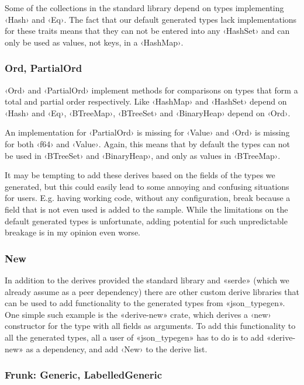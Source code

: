 Some of the collections in the standard library depend on types implementing ‹Hash› and ‹Eq›. The fact that our default generated types lack implementations for these traits means that they can not be entered into any ‹HashSet› and can only be used as values, not keys, in a ‹HashMap›.

\subsubsection{Ord, PartialOrd}

‹Ord› and ‹PartialOrd› implement methods for comparisons on types that form a total and partial order respectively. Like ‹HashMap› and ‹HashSet› depend on ‹Hash› and ‹Eq›, ‹BTreeMap›, ‹BTreeSet› and ‹BinaryHeap› depend on ‹Ord›.

An implementation for ‹PartialOrd› is missing for ‹Value› and ‹Ord› is missing for both ‹f64› and ‹Value›. Again, this means that by default the types can not be used in ‹BTreeSet› and ‹BinaryHeap›, and only as values in ‹BTreeMap›.

It may be tempting to add these derives based on the fields of the types we generated, but this could easily lead to some annoying and confusing situations for users. E.g. having working code, without any configuration, break because a field that is not even used is added to the sample. While the limitations on the default generated types is unfortunate, adding potential for such unpredictable breakage is in my opinion even worse.

\subsubsection{New}

In addition to the derives provided the standard library and «serde»  (which we already assume as a peer dependency) there are other custom derive libraries that can be used to add functionality to the generated types from «json_typegen». One simple such example is the «derive-new» crate, which derives a ‹new› constructor for the type with all fields as arguments. To add this functionality to all the generated types, all a user of «json_typegen» has to do is to add «derive-new» as a dependency, and add ‹New› to the derive list.

\subsubsection{Frunk: Generic, LabelledGeneric}

